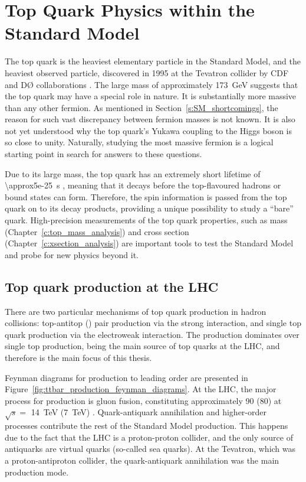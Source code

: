 \newpage
\section{Top Quark Physics within the Standard Model}
\label{s:top_quak_physics}
The top quark is the heaviest elementary particle in the Standard Model, and the heaviest observed particle, discovered
in 1995 at the Tevatron collider by CDF and D{\O} collaborations \autocite{CDF_top_observation, D0_top_observation}. The
large mass of approximately \SI{173}{\GeV} suggests that the top quark may have a special role in nature. It is
substantially more massive than any other fermion. As mentioned in Section~\ref{s:SM_shortcomings}, the reason for such
vast discrepancy between fermion masses is not known. It is also not yet understood why the top quark's Yukawa coupling
to the Higgs boson is so close to unity. Naturally, studying the most massive fermion is a logical starting point in
search for answers to these questions.

Due to its large mass, the top quark has an extremely short lifetime of \SI{\approx5e-25}{\s} \autocite{PDG}, meaning
that it decays before the top-flavoured hadrons or \ttbar bound states can form. Therefore, the spin information is
passed from the top quark on to its decay products, providing a unique possibility to study a ``bare'' quark.
High-precision measurements of the top quark properties, such as mass (Chapter~\ref{c:top_mass_analysis}) and cross
section (Chapter~\ref{c:xsection_analysis}) are important tools to test the Standard Model and probe for new physics
beyond it.

\subsection{Top quark production at the LHC}
\label{ss:top_production}
There are two particular mechanisms of top quark production in hadron collisions: top-antitop (\ttbar) pair production
via the strong interaction, and single top quark production via the electroweak interaction. The \ttbar production
dominates over single top production, being the main source of top quarks at the LHC, and therefore is the main focus of
this thesis.

Feynman diagrams for \ttbar production to leading order are presented in
Figure~\ref{fig:ttbar_production_feynman_diagrams}. At the LHC, the major process for \ttbar production is gluon fusion,
constituting approximately \SI{90}{\pc} (\SI{80}{\pc}) at $\sqrt s =$ \SI{14}{\TeV} (\SI{7}{\TeV}) \autocite{PDG}.
Quark-antiquark annihilation and higher-order processes contribute the rest of the Standard Model \ttbar production.
This happens due to the fact that the LHC is a proton-proton collider, and the only source of antiquarks are virtual
quarks (so-called sea quarks). At the Tevatron, which was a proton-antiproton collider, the quark-antiquark annihilation
was the main \ttbar production mode.

